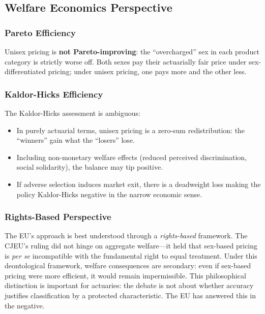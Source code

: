\documentclass[12pt,a4paper]{article}
\begin{document}
\subsection{Welfare Economics Perspective}
\label{subsec:welfare}

\subsubsection{Pareto Efficiency}

Unisex pricing is \textbf{not Pareto-improving}: the ``overcharged'' sex in each product category is strictly worse off. Both sexes pay their actuarially fair price under sex-differentiated pricing; under unisex pricing, one pays more and the other less.

\subsubsection{Kaldor-Hicks Efficiency}

The Kaldor-Hicks assessment is ambiguous:
\begin{itemize}
  \item In purely actuarial terms, unisex pricing is a zero-sum redistribution: the ``winners'' gain what the ``losers'' lose.
  \item Including non-monetary welfare effects (reduced perceived discrimination, social solidarity), the balance may tip positive.
  \item If adverse selection induces market exit, there is a deadweight loss making the policy Kaldor-Hicks negative in the narrow economic sense.
\end{itemize}

\subsubsection{Rights-Based Perspective}

The EU's approach is best understood through a \emph{rights-based} framework. The CJEU's ruling did not hinge on aggregate welfare---it held that sex-based pricing is \emph{per se} incompatible with the fundamental right to equal treatment. Under this deontological framework, welfare consequences are secondary: even if sex-based pricing were more efficient, it would remain impermissible. This philosophical distinction is important for actuaries: the debate is not about whether accuracy justifies classification by a protected characteristic. The EU has answered this in the negative.
\end{document}
